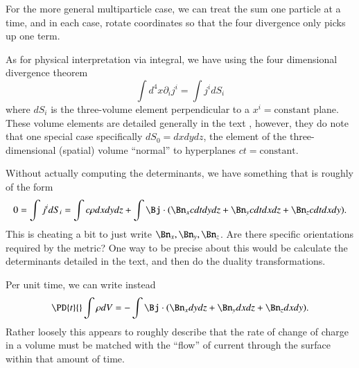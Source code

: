 {For the more general multiparticle case, we can treat the sum one particle at a time, and in each case, rotate coordinates so that the four divergence only picks up one term.

As for physical interpretation via integral, we have using the four dimensional divergence theorem
%
\begin{equation}\label{eqn:relElectroDynProblemSet3:2080}
\int d^4 x \partial_i j^i = \int j^i dS_i
\end{equation}
%
where \(dS_i\) is the three-volume element perpendicular to a \(x^i = \text{constant}\) plane.  These volume elements are detailed generally in the text \citep{landau1980classical}, however, they do note that one special case specifically \(dS_0 = dx dy dz\), the element of the three-dimensional (spatial) volume ``normal'' to hyperplanes \(ct = \text{constant}\).

Without actually computing the determinants, we have something that is roughly of the form
%
\begin{equation}\label{eqn:relElectroDynProblemSet3:2100}
0
= \int j^i dS_i
=
\int c \rho dx dy dz
+\int \Bj \cdot (\Bn_x c dt dy dz + \Bn_y c dt dx dz + \Bn_z c dt dx dy).
\end{equation}
%
This is cheating a bit to just write \(\Bn_x, \Bn_y, \Bn_z\).  Are there specific orientations required by the metric?  One way to be precise about this would be calculate the determinants detailed in the text, and then do the duality transformations.

Per unit time, we can write instead
\begin{equation}\label{eqn:relElectroDynProblemSet3:2120}
\PD{t}{} \int \rho dV
= -\int \Bj \cdot (\Bn_x dy dz + \Bn_y dx dz + \Bn_z dx dy).
\end{equation}
%
Rather loosely this appears to roughly describe that the rate of change of charge in a volume must be matched with the ``flow'' of current through the surface within that amount of time.

}
